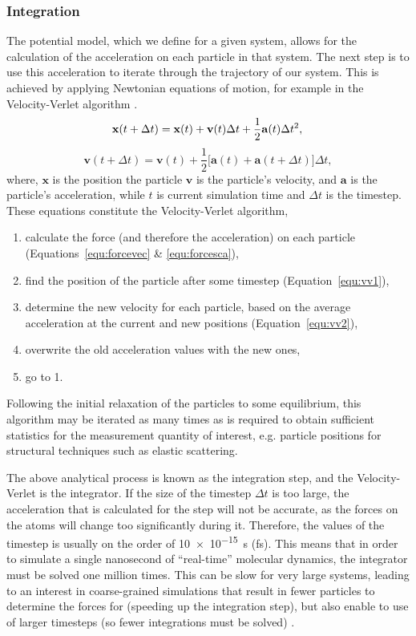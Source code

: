 \subsubsection{Integration}
The potential model, which we define for a given system, allows for the calculation of the acceleration on each particle in that system.
The next step is to use this acceleration to iterate through the trajectory of our system.
This is achieved by applying Newtonian equations of motion, for example in the Velocity-Verlet algorithm \cite{swope_computer_1982}.
%
\begin{equation}
\mathbf{x}(t + \Delta t) = \mathbf{x}(t) + \mathbf{v}(t)\Delta t + \frac{1}{2}\mathbf{a}(t)\Delta t^2, \\
\label{equ:vv1}
\end{equation}
\begin{equation}
\mathbf{v}(t + \Delta t) = \mathbf{v}(t) + \frac{1}{2}\big[\mathbf{a}(t) + \mathbf{a}(t+\Delta t)\big]\Delta t,
\label{equ:vv2}
\end{equation}
%
where, $\mathbf{x}$ is the position the particle $\mathbf{v}$ is the particle's velocity, and $\mathbf{a}$ is the particle's acceleration, while $t$ is current simulation time and $\Delta t$ is the timestep.
These equations constitute the Velocity-Verlet algorithm,
%
\begin{enumerate}
\item calculate the force (and therefore the acceleration) on each particle (Equations~\ref{equ:forcevec} \& \ref{equ:forcesca}),
\item find the position of the particle after some timestep (Equation~\ref{equ:vv1}),
\item determine the new velocity for each particle, based on the average acceleration at the current and new positions (Equation~\ref{equ:vv2}),
\item overwrite the old acceleration values with the new ones,
\item go to 1.
\end{enumerate}
%
Following the initial relaxation of the particles to some equilibrium, this algorithm may be iterated as many times as is required to obtain sufficient statistics for the measurement quantity of interest, e.g. particle positions for structural techniques such as elastic scattering.

The above analytical process is known as the integration step, and the Velocity-Verlet is the integrator.
If the size of the timestep $\Delta t$ is too large, the acceleration that is calculated for the step will not be accurate, as the forces on the atoms will change too significantly during it.
Therefore, the values of the timestep is usually on the order of \SI{10e-15}{\second} (\si{\femto\second}).
This means that in order to simulate a single nanosecond of ``real-time'' molecular dynamics, the integrator must be solved one million times.
This can be slow for very large systems, leading to an interest in coarse-grained simulations that result in fewer particles to determine the forces for (speeding up the integration step), but also enable to use of larger timesteps (so fewer integrations must be solved) \cite{rudd_coarse-grained_1998,brini_systematic_2013}.

